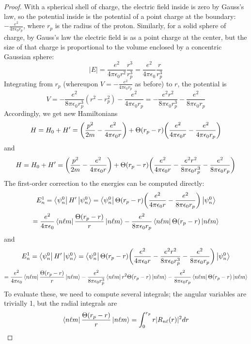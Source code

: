 \documentclass{article}
\begin{document}
\begin{proof}
  With a spherical shell of charge, the electric field inside is zero by Gauss's law,
  so the potential inside is the potential of a point charge at the boundary: $-\frac{e^{2}}{4\pi \epsilon_{0}r_{p}}$,
  where $r_{p}$ is the radius of the proton.
  Similarly, for a solid sphere of charge, by Gauss's law the electric field is as a point charge at the center,
  but the size of that charge is proportional to the volume enclosed by a concentric Gaussian sphere:
  \[
    |E| = \frac{e^{2}}{4\pi\epsilon_{0}r^{2}}\frac{r^{3}}{r_{p}^{3}} = \frac{e^{2}}{4\pi\epsilon_{0}}\frac{r}{r_{p}^{3}}
  \]
  Integrating from $r_{p}$ (whereupon $V = -\frac{e^{2}}{4\pi\epsilon_{0}r_{p}}$ as before) to $r$, the potential is
  \[
    V = -\frac{e^{2}}{8\pi\epsilon_{0}r_{p}^{3}}(r^{2} - r_{p}^{2}) - \frac{e^{2}}{4\pi\epsilon_{0}r_{p}}
    = -\frac{e^{2}r^{2}}{8\pi\epsilon_{0}r_{p}^{3}} - \frac{e^{2}}{8\pi\epsilon_{0} r_{p}}
  \]
  Accordingly, we get new Hamiltonians
  \[
    H = H_{0} + H' = \qty(\frac{p^{2}}{2m} - \frac{e^{2}}{4\pi\epsilon_{0} r}) + \Theta(r_{p} - r)\qty(\frac{e^{2}}{4\pi\epsilon_{0} r}
    - \frac{e^{2}}{4\pi\epsilon_{0} r_{p}})
  \]
  and
  \[
    H = H_{0} + H' = \qty(\frac{p^{2}}{2m} - \frac{e^{2}}{4\pi\epsilon_{0} r}) + \Theta(r_{p} - r)\qty(\frac{e^{2}}{4\pi\epsilon_{0} r}
    - \frac{e^{2}r^{2}}{8\pi\epsilon_{0} r_{p}^{3}} - \frac{e^{2}}{8\pi\epsilon_{0}r_{p}})
  \]
  The first-order correction to the energies can be computed directly:
  \[
    E_{n}^{1} = \bra{\psi_{n}^{0}} H' \ket{\psi_{n}^{0}}
    = \bra{\psi_{n}^{0}} \Theta(r_{p} - r)\qty(\frac{e^{2}}{4\pi\epsilon_{0} r} - \frac{e^{2}}{8\pi\epsilon_{0} r_{p}}) \ket{\psi_{n}^{0}}
  \]
  \[
    = \frac{e^{2}}{4\pi\epsilon_{0}}\bra{n\ell m} \frac{\Theta(r_{p} - r)}{r} \ket{n\ell m}
    - \frac{e^{2}}{8\pi\epsilon_{0} r_{p}}\bra{n\ell m} \Theta(r_{p} - r) \ket{n\ell m}
  \]
  and
  \[
    E_{n}^{1} = \bra{\psi_{n}^{0}} H' \ket{\psi_{n}^{0}}
    = \bra{\psi_{n}^{0}} \Theta(r_{p} - r)\qty(\frac{e^{2}}{4\pi\epsilon_{0} r} - \frac{e^{2}r^{2}}{8\pi\epsilon_{0} r_{p}^{3}}
    - \frac{e^{2}}{8\pi\epsilon_{0} r_{p}}) \ket{\psi_{n}^{0}}
  \]
  \[
    = \frac{e^{2}}{4\pi\epsilon_{0}}\bra{n\ell m} \frac{\Theta(r_{p} - r)}{r} \ket{n\ell m}
    - \frac{e^{2}}{8\pi\epsilon_{0}r_{p}^{3}}\bra{n\ell m} r^{2}\Theta(r_{p} - r) \ket{n\ell m}
    - \frac{e^{2}}{8\pi\epsilon_{0} r_{p}}\bra{n\ell m} \Theta(r_{p} - r) \ket{n\ell m}
  \]
  To evaluate these, we need to compute several integrals; the angular variables are trivially 1, but the radial integrals are
  \[
    \bra{n\ell m} \frac{\Theta(r_{p} - r)}{r} \ket{n\ell m} = \int_{0}^{r_{p}}r|R_{n\ell}(r)|^{2}dr
\]
\end{proof}
\end{document}
